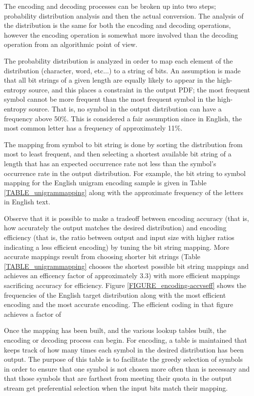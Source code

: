 \documentclass[12pt]{report}
\theoremstyle{remark}
\theoremstyle{definition}
\theoremstyle{definition}
\theoremstyle{definition}
\begin{document}
\begin{appendices}
The encoding and decoding processes can be broken up into two steps; probability
distribution analysis and then the actual conversion. The analysis of the
distribution is the same for both the encoding and decoding operations, however
the encoding operation is somewhat more involved than the decoding operation
from an algorithmic point of view.

The probability distribution is analyzed in order to map each element of the
distribution (character, word, etc$\ldots$) to a string of bits. An assumption
is made that all bit strings of a given length are equally likely to appear in
the high-entropy source, and this places a constraint in the output PDF; the
most frequent symbol cannot be more frequent than the most frequent symbol in
the high-entropy source. That is, no symbol in the output distribution can have
a frequency above 50\%. This is considered a fair assumption since in English,
the most common letter has a frequency of approximately 11\%.

The mapping from symbol to bit string is done by sorting the distribution from
most to least frequent, and then selecting a shortest available bit string of a
length that has an expected occurrence rate not less than the symbol's
occurrence rate in the output distribution. For example, the bit string to
symbol mapping for the English unigram encoding sample is given in Table
\ref{TABLE_unigrammapping} along with the approximate frequency of the letters
in English text.

Observe that it is possible to make a tradeoff between encoding accuracy (that
is, how accurately the output matches the desired distribution) and encoding
efficiency (that is, the ratio between output and input size with higher ratios
indicating a less efficient encoding) by tuning the bit string mapping. More
accurate mappings result from choosing shorter bit strings (Table
\ref{TABLE_unigrammapping} chooses the shortest possible bit string mappings and
achieves an efficency factor of approximately 3.3) with more efficient mappings
sacrificing accuracy for efficiency. Figure \ref{FIGURE_encoding-accvseff} shows
the frequencies of the English target distribution along with the most efficient
encoding and the most accurate encoding. The efficient coding in that figure
achieves a factor of

Once the mapping has been built, and the various lookup tables built, the
encoding or decoding process can begin. For encoding, a table is maintained that
keeps track of how many times each symbol in the desired distribution has been
output. The purpose of this table is to facilitate the greedy selection of
symbols in order to ensure that one symbol is not chosen more often than is
necessary and that those symbols that are farthest from meeting their quota in
the output stream get preferential selection when the input bits match their
mapping.


\end{appendices}
\end{document}
